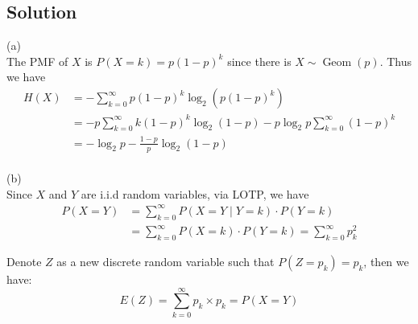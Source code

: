 \documentclass[a4paper]{article}
\begin{document}
\subsection{Solution}
(a)\\ The PMF of $X$ is $P(X=k)=p(1-p)^k$ since there is $X \sim \operatorname{Geom}(p)$. Thus we have
$$
\begin{aligned}
H(X) & =-\sum_{k=0}^{\infty} p(1-p)^k \log _2\left(p(1-p)^k\right) \\
& =-p \sum_{k=0}^{\infty} k(1-p)^k \log _2(1-p)-p \log _2 p \sum_{k=0}^{\infty}(1-p)^k \\
& =-\log _2 p-\frac{1-p}{p} \log _2(1-p)
\end{aligned}
$$\\
(b)\\ Since $X$ and $Y$ are i.i.d random variables, via LOTP, we have
$$
\begin{aligned}
P(X=Y) & =\sum_{k=0}^{\infty} P(X=Y \mid Y=k) \cdot P(Y=k) \\
& =\sum_{k=0}^{\infty} P(X=k) \cdot P(Y=k)=\sum_{k=0}^{\infty} p_k^2
\end{aligned}
$$

Denote $Z$ as a new discrete random variable such that $P\left(Z=p_k\right)=p_k$, then we have:
$$
E(Z)=\sum_{k=0}^{\infty} p_k \times p_k=P(X=Y)
$$
\end{document}

